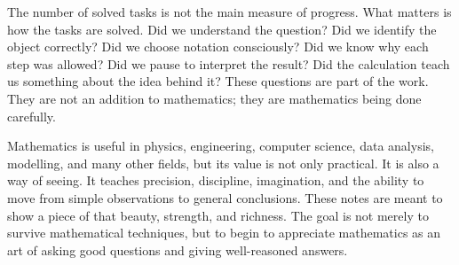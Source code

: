 The number of solved tasks is not the main measure of progress. What matters is how the tasks are solved. Did we understand the question? Did we identify the object correctly? Did we choose notation consciously? Did we know why each step was allowed? Did we pause to interpret the result? Did the calculation teach us something about the idea behind it? These questions are part of the work. They are not an addition to mathematics; they are mathematics being done carefully.

Mathematics is useful in physics, engineering, computer science, data analysis, modelling, and many other fields, but its value is not only practical. It is also a way of seeing. It teaches precision, discipline, imagination, and the ability to move from simple observations to general conclusions. These notes are meant to show a piece of that beauty, strength, and richness. The goal is not merely to survive mathematical techniques, but to begin to appreciate mathematics as an art of asking good questions and giving well-reasoned answers.
